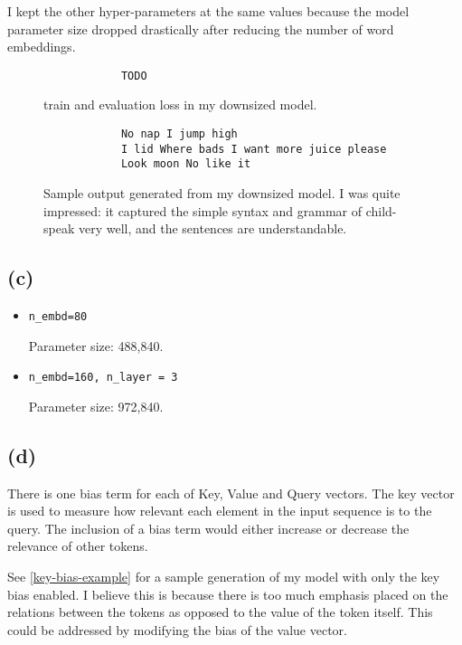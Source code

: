 \documentclass{article}  %
\begin{document}
	I kept the other hyper-parameters at the same values because the model parameter size dropped drastically after reducing the number of word embeddings.
	
	\begin{figure}[H]
		\begin{verbatim}
			TODO
		\end{verbatim}
		\caption{train and evaluation loss in my downsized model.}
		\label{part-b-loss}
	\end{figure}
	
	\begin{figure}[H]
		\begin{verbatim}
			No nap I jump high
			I lid Where bads I want more juice please
			Look moon No like it
		\end{verbatim}
		\caption{Sample output generated from my downsized model. I was quite impressed: it captured the simple syntax and grammar of child-speak very well, and the sentences are understandable.}
	\end{figure}
	
	\subsection*{(c)}
	
	\begin{itemize}
		\item \verb|n_embd=80|
		
		Parameter size: 488,840.
		
		\item \verb|n_embd=160, n_layer = 3|
		
		Parameter size: 972,840.
	\end{itemize}
	
	\subsection*{(d)}
	
	There is one bias term for each of Key, Value and Query vectors.
	\newline\newline
	The key vector is used to measure how relevant each element in the input sequence is to the query. The inclusion of a bias term would either increase or decrease the relevance of other tokens.
	
	See \ref{key-bias-example} for a sample generation of my model with only the key bias enabled. I believe this is because there is too much emphasis placed on the relations between the tokens as opposed to the value of the token itself. This could be addressed by modifying the bias of the value vector.
	
\end{document}

